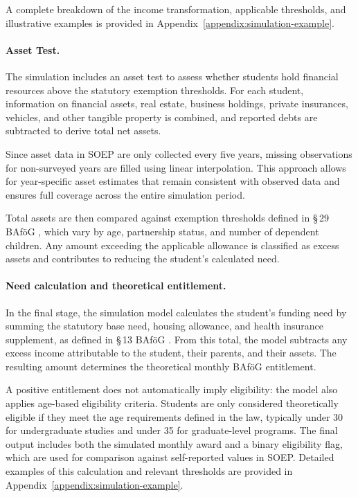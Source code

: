 A complete breakdown of the income transformation, applicable thresholds, and illustrative examples is provided in Appendix~\ref{appendix:simulation-example}.

\paragraph{Asset Test.}
The simulation includes an asset test to assess whether students hold financial resources above the statutory exemption thresholds. 
For each student, information on financial assets, real estate, business holdings, private insurances, vehicles, and other tangible property is combined, and reported debts are subtracted to derive total net assets.

Since asset data in SOEP are only collected every five years, missing observations for non-surveyed years are filled using linear interpolation. 
This approach allows for year-specific asset estimates that remain consistent with observed data and ensures full coverage across the entire simulation period.

Total assets are then compared against exemption thresholds defined in §\,29 BAföG \citep{bafoeg_law}, which vary by age, partnership status, and number of dependent children. 
Any amount exceeding the applicable allowance is classified as excess assets and contributes to reducing the student's calculated need. 


\paragraph{Need calculation and theoretical entitlement.}
In the final stage, the simulation model calculates the student's funding need by summing the statutory base need, housing allowance, and health insurance supplement, as defined in §\,13 BAföG \citep{bafoeg_law}. 
From this total, the model subtracts any excess income attributable to the student, their parents, and their assets. 
The resulting amount determines the theoretical monthly BAföG entitlement.

A positive entitlement does not automatically imply eligibility: the model also applies age-based eligibility criteria. 
Students are only considered theoretically eligible if they meet the age requirements defined in the law, typically under 30 for undergraduate studies and under 35 for graduate-level programs. 
The final output includes both the simulated monthly award and a binary eligibility flag, which are used for comparison against self-reported values in SOEP. 
Detailed examples of this calculation and relevant thresholds are provided in Appendix~\ref{appendix:simulation-example}.




